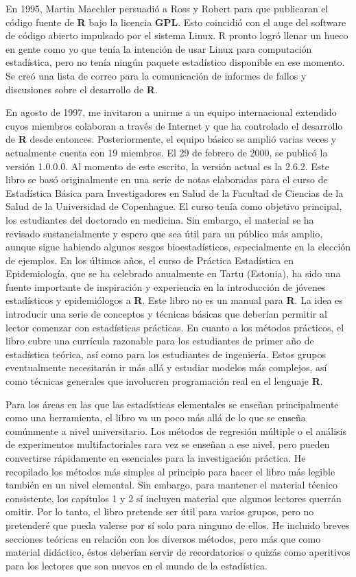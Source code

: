 \documentclass[spanish]{extbook}
\numberwithin{equation}{section}
\numberwithin{figure}{section}
\begin{document}
En 1995, Martin Maechler persuadió a Ross y Robert para que publicaran el
código fuente de \textbf{R} bajo la licencia \textbf{GPL}. Esto coincidió con
el auge del software de código abierto impulsado por el sistema Linux. R pronto
logró llenar un hueco en gente como yo que tenía la intención de usar Linux
para computación estadística, pero no tenía ningún paquete estadístico
disponible en ese momento. Se creó una lista de correo para la comunicación de
informes de fallos y discusiones sobre el desarrollo de \textbf{R}.

En agosto de 1997, me invitaron a unirme a un equipo internacional extendido
cuyos miembros colaboran a través de Internet y que ha controlado el desarrollo
de \textbf{R} desde entonces. Posteriormente, el equipo básico se amplió varias
veces y actualmente cuenta con 19 miembros. El 29 de febrero de 2000, se
publicó la versión 1.0.0.0. Al momento de este escrito, la versión actual es
la 2.6.2. Este libro se basó originalmente en una serie de notas elaboradas
para el curso de Estadística Básica para Investigadores en Salud de la Facultad
de Ciencias de la Salud de la Universidad de Copenhague. El curso tenía como
objetivo principal, los estudiantes del doctorado en medicina. Sin embargo, el
material se ha revisado sustancialmente y espero que sea útil para un público
más amplio, aunque sigue habiendo algunos sesgos bioestadísticos, especialmente
en la elección de ejemplos. En los últimos años, el curso de Práctica
Estadística en Epidemiología, que se ha celebrado anualmente en Tartu
(Estonia), ha sido una fuente importante de inspiración y experiencia en la
introducción de jóvenes estadísticos y epidemiólogos a \textbf{R}.  Este libro
no es un manual para \textbf{R}.  La idea es introducir una serie de conceptos
y técnicas básicas que deberían permitir al lector comenzar con estadísticas
prácticas. En cuanto a los métodos prácticos, el libro cubre una currícula
razonable para los estudiantes de primer año de estadística teórica, así como
para los estudiantes de ingeniería. Estos grupos eventualmente necesitarán ir
más allá y estudiar modelos más complejos, así como técnicas generales que
involucren programación real en el lenguaje \textbf{R}.

Para los áreas en las que las estadísticas elementales se enseñan
principalmente como una herramienta, el libro va un poco más allá de lo que se
enseña comúnmente a nivel universitario. Los métodos de regresión múltiple o el
análisis de experimentos multifactoriales rara vez se enseñan a ese nivel, pero
pueden convertirse rápidamente en esenciales para la investigación práctica. He
recopilado los métodos más simples al principio para hacer el libro más legible
también en un nivel elemental. Sin embargo, para mantener el material técnico
consistente, los capítulos 1 y 2 sí incluyen material que algunos lectores
querrán omitir. Por lo tanto, el libro pretende ser útil para varios grupos,
pero no pretenderé que pueda valerse por sí solo para ninguno de ellos. He
incluido breves secciones teóricas en relación con los diversos métodos, pero
más que como material didáctico, éstos deberían servir de recordatorios o
quizás como aperitivos para los lectores que son nuevos en el mundo de la
estadística.
\end{document}
